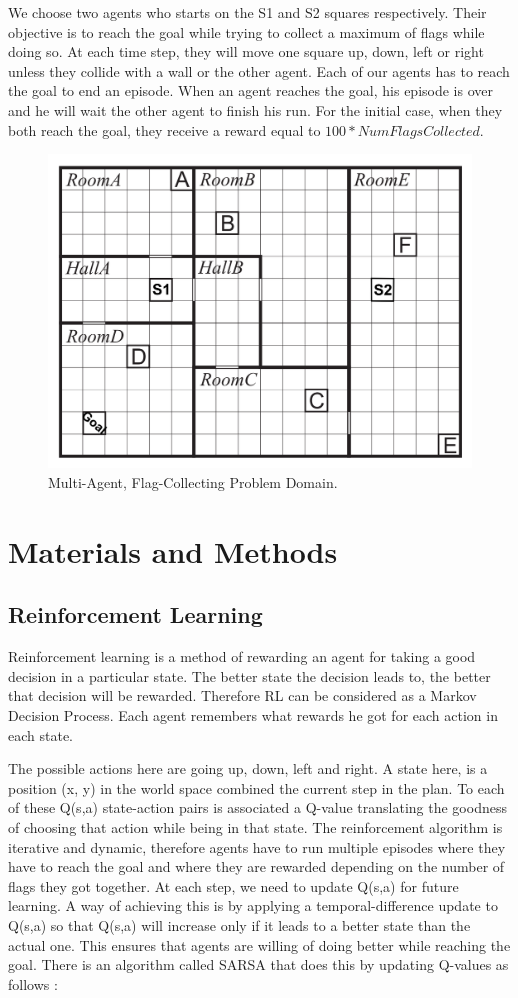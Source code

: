 \documentclass[letterpaper]{article}
\begin{document}
We choose two agents who starts on the S1 and S2 squares respectively. Their objective is to reach the goal while trying to collect a maximum of flags while doing so. At each time step, they will move one square up, down, left or right unless they collide with a wall or the other agent. Each of our agents has to reach the goal to end an episode. When an agent reaches the goal, his episode is over and he will wait the other agent to finish his run. For the initial case, when they both reach the goal, they receive a reward equal to $100*NumFlagsCollected$. 

\begin{figure}[h!]
\centering
  \includegraphics[width=0.75\linewidth]{img/stydyCase.png}
  \caption{Multi-Agent, Flag-Collecting Problem Domain.}
  \label{fig:studycase1}
\end{figure}



\section{Materials and Methods}
\subsection{Reinforcement Learning}
Reinforcement learning is a method of rewarding an agent for taking a good decision in a particular state. The better state the decision leads to, the better that decision will be rewarded. Therefore RL can be considered as a Markov Decision Process. Each agent remembers what rewards he got for each action in each state. 

The possible actions here are going up, down, left and right. A state here, is a position (x, y) in the world space combined the current step in the plan. To each of these Q(s,a) state-action pairs is associated a Q-value translating the goodness of choosing that action while being in that state. The reinforcement algorithm is iterative and dynamic, therefore agents have to run multiple episodes where they have to reach the goal and where they are rewarded depending on the number of flags they got together. At each step, we need to update Q(s,a)  for future learning. A way of achieving this is by applying a temporal-difference update to Q(s,a) so that Q(s,a) will increase only if it leads to a better state than the actual one. This ensures that agents are willing of doing better while reaching the goal. There is an algorithm called SARSA that does this by updating Q-values as follows : \\
\end{document}

